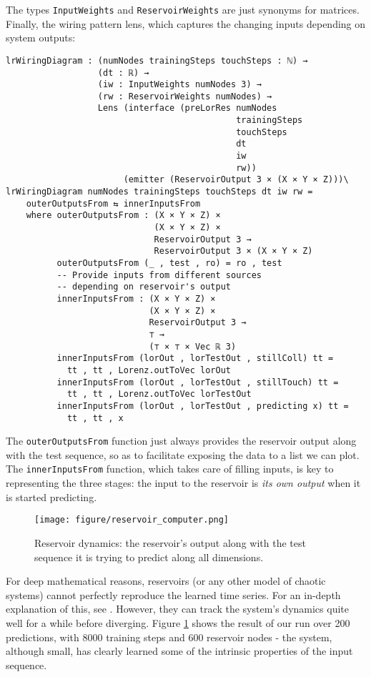 The types \texttt{InputWeights} and \texttt{ReservoirWeights} are just synonyms for matrices. Finally, the wiring pattern lens, which captures the changing inputs depending on system outputs:

\begin{verbatim}
lrWiringDiagram : (numNodes trainingSteps touchSteps : ℕ) → 
                  (dt : ℝ) → 
                  (iw : InputWeights numNodes 3) → 
                  (rw : ReservoirWeights numNodes) → 
                  Lens (interface (preLorRes numNodes 
                                             trainingSteps 
                                             touchSteps 
                                             dt 
                                             iw 
                                             rw)) 
                       (emitter (ReservoirOutput 3 × (X × Y × Z)))\
lrWiringDiagram numNodes trainingSteps touchSteps dt iw rw = 
    outerOutputsFrom ⇆ innerInputsFrom
    where outerOutputsFrom : (X × Y × Z) × 
                             (X × Y × Z) × 
                             ReservoirOutput 3 → 
                             ReservoirOutput 3 × (X × Y × Z)
          outerOutputsFrom (_ , test , ro) = ro , test
          -- Provide inputs from different sources
          -- depending on reservoir's output
          innerInputsFrom : (X × Y × Z) × 
                            (X × Y × Z) × 
                            ReservoirOutput 3 → 
                            ⊤ → 
                            (⊤ × ⊤ × Vec ℝ 3)
          innerInputsFrom (lorOut , lorTestOut , stillColl) tt = 
            tt , tt , Lorenz.outToVec lorOut
          innerInputsFrom (lorOut , lorTestOut , stillTouch) tt =
            tt , tt , Lorenz.outToVec lorTestOut
          innerInputsFrom (lorOut , lorTestOut , predicting x) tt = 
            tt , tt , x
\end{verbatim}

The \texttt{outerOutputsFrom} function just always provides the reservoir output along with the test sequence, so as to facilitate exposing the data to a list we can plot. The \texttt{innerInputsFrom} function, which takes care of filling inputs, is key to representing the three stages: the input to the reservoir is \textit{its own output} when it is started predicting.

\begin{figure}
    \centering
    \texttt{[image: figure/reservoir\_computer.png]}
    \caption{Reservoir dynamics: the reservoir's output along with the test sequence it is trying to predict along all dimensions.}
    \label{fig:reservoir_dynamics}
\end{figure}

For deep mathematical reasons, reservoirs (or any other model of chaotic systems) cannot perfectly reproduce the learned time series. For an in-depth explanation of this, see \cite{strogatz2001nonlinear}. However, they can track the system's dynamics quite well for a while before diverging. Figure \ref{fig:reservoir_dynamics} shows the result of our run over 200 predictions, with 8000 training steps and 600 reservoir nodes - the system, although small, has clearly learned some of the intrinsic properties of the input sequence.